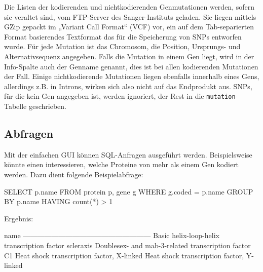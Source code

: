 \documentclass{scrartcl}
\begin{document}
Die Listen der kodierenden und nichtkodierenden Genmutationen werden, sofern sie veraltet sind, vom FTP-Server des Sanger-Instituts geladen. Sie liegen mittels GZip gepackt im „Variant Call Format“ (VCF) vor, ein auf dem Tab-separierten Format basierendes Textformat das für die Speicherung von SNPs entworfen wurde. Für jede Mutation ist das Chromosom, die Position, Ursprungs- und Alternativsequenz angegeben. Falls die Mutation in einem Gen liegt, wird in der Info-Spalte auch der Genname genannt, dies ist bei allen kodierenden Mutationen der Fall. Einige nichtkodierende Mutationen liegen ebenfalls innerhalb eines Gens, allerdings z.B. in Introns, wirken sich also nicht auf das Endprodukt aus. SNPs, für die kein Gen angegeben ist, werden ignoriert, der Rest in die \texttt{mutation}-Tabelle geschrieben.

\subsection{Abfragen}

Mit der einfachen GUI können SQL-Anfragen ausgeführt werden. Beispielsweise könnte einen interessieren, welche Proteine von mehr als einem Gen kodiert werden. Dazu dient folgende Beispielabfrage:

SELECT p.name 
FROM protein p, gene g 
WHERE g.coded = p.name 
GROUP BY p.name 
HAVING count(*) > 1

Ergebnis:

name
------------------------------------------------------
Basic helix-loop-helix transcription factor scleraxis
Doublesex- and mab-3-related transcription factor C1
Heat shock transcription factor, X-linked
Heat shock transcription factor, Y-linked
\end{document}
